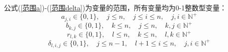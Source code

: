 \documentclass[bwprint]{gmcmthesis}
\begin{document}
公式(\ref{范围a})-(\ref{范围delta})为变量的范围，所有变量均为0-1整数型变量：
\begin{equation}
    a_{j,i} \in \{0,1\}, \quad j \le n , \quad j \le i \le n, \quad j,i \in \mathbb{N}^+ \label{范围a}
\end{equation}
\begin{equation}
    b_{k,j} \in \{0,1\}, \quad k \le n , \quad j \le n, \quad k,j \in \mathbb{N}^+ \label{范围b}
\end{equation}
\begin{equation}
    r_{l,k} \in \{0,1\}, \quad l \le n , \quad k \le n, \quad l,k \in \mathbb{N}^+ \label{范围r}
\end{equation}
\begin{equation}
    \delta_{l,i,j} \in \{0,1\}, \quad j \le n-1 , \quad l+1 \le i \le n, \quad j,i \in \mathbb{N}^+ \label{范围delta}
\end{equation}
\end{document}
